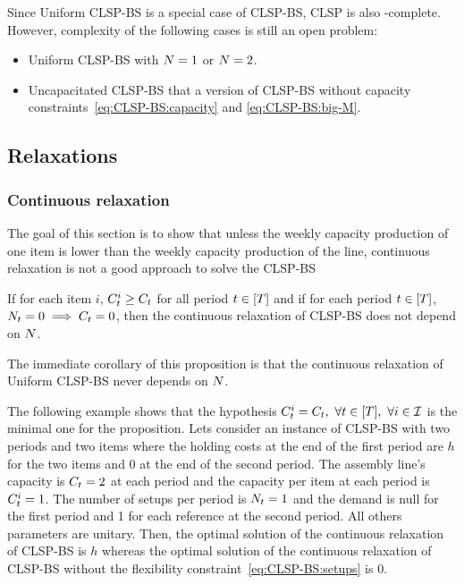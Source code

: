 Since Uniform CLSP-BS is a special case of CLSP-BS, CLSP is also \NP-complete. However, complexity of the following cases is still an open problem:
\begin{itemize}
\item Uniform CLSP-BS with $N=1$ or $N=2$.
\item Uncapacitated CLSP-BS that a version of CLSP-BS without capacity constraints~\eqref{eq:CLSP-BS:capacity} and \eqref{eq:CLSP-BS:big-M}.
\end{itemize}



\subsection{Relaxations}

\subsubsection{Continuous relaxation}

The goal of this section is to show that unless the weekly capacity production of one item is lower than the weekly capacity production of the line, continuous relaxation is not a good approach to solve the CLSP-BS

\begin{prop}\label{prop:relaxation-independant-N}
If for each item $i$, $C_t^i\ge C_t$ for all period $t\in\range{\horizon}$ and if for each period $t\in\range{\horizon}$, $N_t=0\implies C_t=0$, then the continuous relaxation of CLSP-BS does not depend on $N$.
\end{prop}

The immediate corollary of this proposition is that the continuous relaxation of Uniform CLSP-BS never depends on $N$.


The following example shows that the hypothesis $\capacity_t^i=\capacity_t,\ \forall t\in\range{\horizon},\ \forall i\in\REF$ is the minimal one for the proposition. Lets consider an instance of CLSP-BS  with two periods and two items where the holding costs at the end of the first period are $h$ for the two items and 0 at the end of the second period. The assembly line's capacity is $C_t=2$ at each period and the capacity per item at each period is $C_t^i=1$. The number of setups per period is $N_t=1$ and the demand is null for the first period and 1 for each reference at the second period. All others parameters are unitary. Then, the optimal solution of the continuous relaxation of CLSP-BS is $h$ whereas the optimal solution of the continuous relaxation of CLSP-BS without the flexibility constraint~\eqref{eq:CLSP-BS:setups} is 0.

